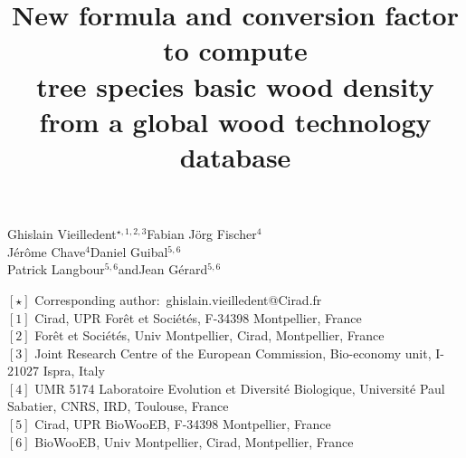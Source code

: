 \documentclass[a4paper, 12pt, leqno, dvipsnames]{article}\usepackage[]{graphicx}\usepackage[]{color}
\title{New formula and conversion factor to compute\\tree species basic wood density from a global wood technology database}
\author{}
\date{}
\begin{document}
\maketitle
\vspace{-1cm}
\begin{center}
  \large{Ghislain Vieilledent$^{\star,1,2,3}$\hspace{1cm}Fabian J\"org Fischer$^{4}$\\
  \vspace{0.15cm}
  Jérôme Chave$^{4}$\hspace{1cm}Daniel Guibal$^{5,6}$\\
  \vspace{0.15cm}
  Patrick Langbour$^{5,6}$\hspace{1cm}and\hspace{1cm}Jean Gérard$^{5,6}$}
\end{center}

\vspace{0.3cm}

% 

{\footnotesize
  \begin{flushleft}
    $[\star]$ Corresponding author:~ghislain.vieilledent@Cirad.fr\\
    $[1]$ Cirad, UPR Forêt et Sociétés, F-34398 Montpellier, France\\
    $[2]$ Forêt et Sociétés, Univ Montpellier, Cirad, Montpellier, France\\
    $[3]$ Joint Research Centre of the European Commission, Bio-economy unit, I-21027 Ispra, Italy\\
    $[4]$ UMR 5174 Laboratoire Evolution et Diversité Biologique, Université Paul Sabatier, CNRS, IRD, Toulouse, France\\
    $[5]$ Cirad, UPR BioWooEB, F-34398 Montpellier, France\\
    $[6]$ BioWooEB, Univ Montpellier, Cirad, Montpellier, France\\
\end{flushleft}}
\end{document}
